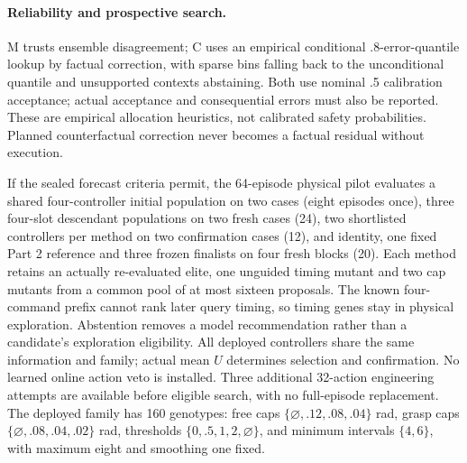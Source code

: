 \paragraph{Reliability and prospective search.}
M trusts ensemble disagreement; C uses an empirical conditional .8-error-quantile
lookup by factual correction, with sparse bins falling back to the unconditional
quantile and unsupported contexts abstaining. Both use nominal .5 calibration
acceptance; actual acceptance and consequential errors must also be reported.
These are empirical allocation heuristics, not calibrated safety probabilities.
Planned counterfactual correction never becomes a factual residual without execution.

If the sealed forecast criteria permit, the 64-episode physical pilot evaluates a
shared four-controller initial population on two cases (eight episodes once),
three four-slot descendant populations on two fresh cases (24), two shortlisted
controllers per method on two confirmation cases (12), and identity, one fixed
Part 2 reference and three frozen finalists on four fresh blocks (20). Each
method retains an actually re-evaluated elite, one unguided timing mutant and
two cap mutants from a common pool of at most sixteen proposals. The known
four-command prefix cannot rank later query timing, so timing genes stay in
physical exploration. Abstention removes a model recommendation rather than a
candidate's exploration eligibility. All deployed controllers share the same
information and family; actual mean $U$ determines selection and confirmation.
No learned online action veto is installed. Three additional 32-action engineering
attempts are available before eligible search, with no full-episode replacement.
The deployed family has 160 genotypes: free caps
$\{\varnothing,.12,.08,.04\}$ rad, grasp caps
$\{\varnothing,.08,.04,.02\}$ rad, thresholds $\{0,.5,1,2,\varnothing\}$,
and minimum intervals $\{4,6\}$, with maximum eight and smoothing one fixed.
